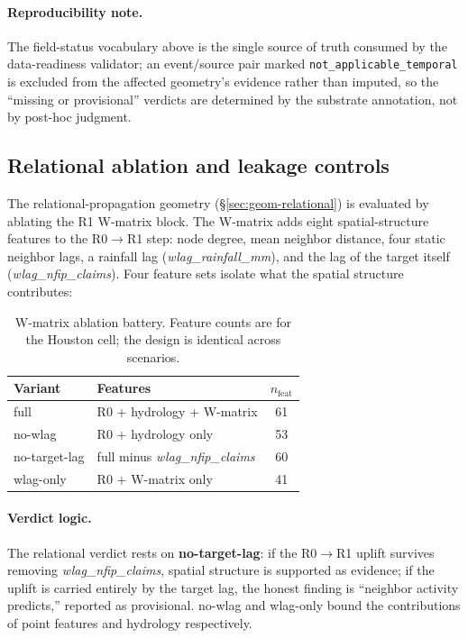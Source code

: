 \paragraph{Reproducibility note.}
The field-status vocabulary above is the single source of truth consumed
by the data-readiness validator; an event/source pair marked
\texttt{not\_applicable\_temporal} is excluded from the affected geometry's
evidence rather than imputed, so the ``missing or provisional'' verdicts
are determined by the substrate annotation, not by post-hoc judgment.

\subsection{Relational ablation and leakage controls}
\label{app:relational-ablation}
The relational-propagation geometry (\S\ref{sec:geom-relational}) is
evaluated by ablating the R1 W-matrix block. The W-matrix adds eight
spatial-structure features to the R0$\to$R1 step: node degree, mean
neighbor distance, four static neighbor lags, a rainfall lag
(\textit{wlag\_rainfall\_mm}), and the lag of the target itself
(\textit{wlag\_nfip\_claims}). Four feature sets isolate what the spatial
structure contributes:

\begin{table}[h]
\centering
\caption{W-matrix ablation battery. Feature counts are for the Houston
  cell; the design is identical across scenarios.}
\label{app:tab:ablation}
\small
\begin{tabular}{@{}llc@{}}
\toprule
\textbf{Variant} & \textbf{Features} & \textbf{$n_\text{feat}$} \\
\midrule
full          & R0 + hydrology + W-matrix              & 61 \\
no-wlag       & R0 + hydrology only                    & 53 \\
no-target-lag & full minus \textit{wlag\_nfip\_claims} & 60 \\
wlag-only     & R0 + W-matrix only                     & 41 \\
\bottomrule
\end{tabular}
\end{table}

\paragraph{Verdict logic.} The relational verdict rests on
\textbf{no-target-lag}: if the R0$\to$R1 uplift survives removing
\textit{wlag\_nfip\_claims}, spatial structure is supported as evidence;
if the uplift is carried entirely by the target lag, the honest finding is
``neighbor activity predicts,'' reported as provisional. no-wlag and
wlag-only bound the contributions of point features and hydrology
respectively.

